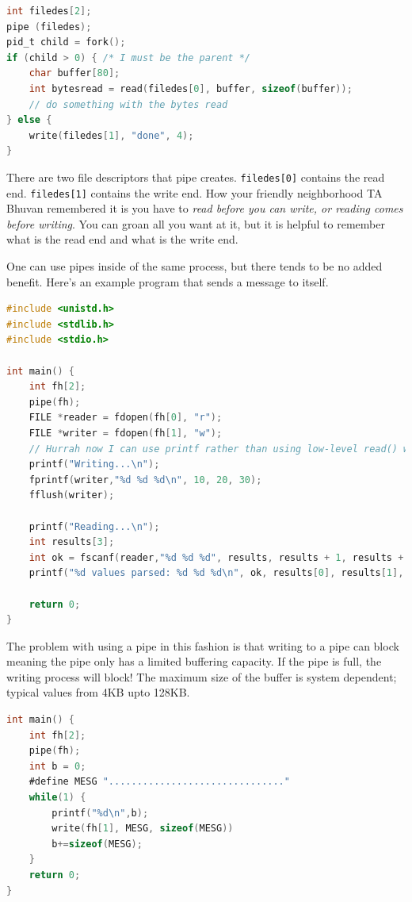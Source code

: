 \begin{lstlisting}[language=C]
int filedes[2];
pipe (filedes);
pid_t child = fork();
if (child > 0) { /* I must be the parent */
    char buffer[80];
    int bytesread = read(filedes[0], buffer, sizeof(buffer));
    // do something with the bytes read    
} else {
	write(filedes[1], "done", 4);
}
\end{lstlisting}

There are two file descriptors that pipe creates. \texttt{filedes[0]} contains the read end. \texttt{filedes[1]} contains the write end. How your friendly neighborhood TA Bhuvan remembered it is you have to \textit{read before you can write, or reading comes before writing}. You can groan all you want at it, but it is helpful to remember what is the read end and what is the write end.

One can use pipes inside of the same process, but there tends to be no added benefit. Here's an example program that sends a message to itself.

\begin{lstlisting}[language=C]
#include <unistd.h>
#include <stdlib.h>
#include <stdio.h>

int main() {
    int fh[2];
    pipe(fh);
    FILE *reader = fdopen(fh[0], "r");
    FILE *writer = fdopen(fh[1], "w");
    // Hurrah now I can use printf rather than using low-level read() write()
    printf("Writing...\n");
    fprintf(writer,"%d %d %d\n", 10, 20, 30);
    fflush(writer);
    
    printf("Reading...\n");
    int results[3];
    int ok = fscanf(reader,"%d %d %d", results, results + 1, results + 2);
    printf("%d values parsed: %d %d %d\n", ok, results[0], results[1], results[2]);
    
    return 0;
}
\end{lstlisting}

The problem with using a pipe in this fashion is that writing to a pipe can block meaning the pipe only has a limited buffering capacity. If the pipe is full, the writing process will block! The maximum size of the buffer is system dependent; typical values from 4KB upto 128KB.

\begin{lstlisting}[language=C]
int main() {
    int fh[2];
    pipe(fh);
    int b = 0;
    #define MESG "..............................."
    while(1) {
        printf("%d\n",b);
        write(fh[1], MESG, sizeof(MESG))
        b+=sizeof(MESG);
    }
    return 0;
}
\end{lstlisting}

